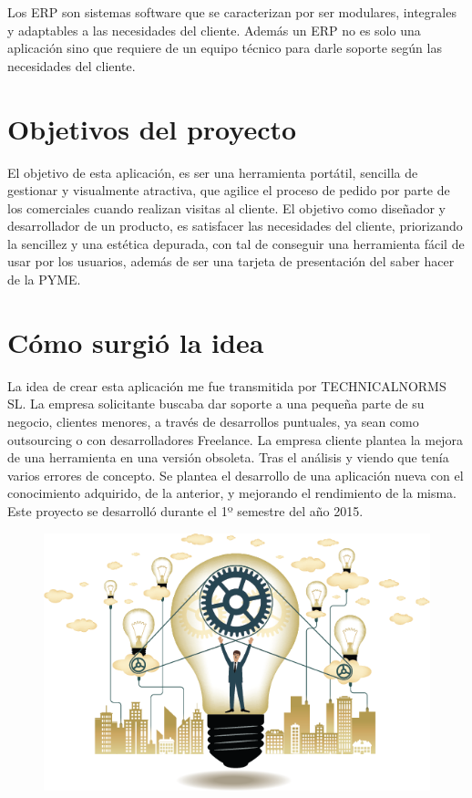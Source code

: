 Los ERP son sistemas software que se caracterizan por ser modulares, integrales y adaptables a las necesidades del cliente. Además un ERP no es solo una aplicación sino que requiere de un equipo técnico para darle soporte según las necesidades del cliente.

\section{Objetivos del proyecto}

El objetivo de esta aplicación, es ser una herramienta portátil, sencilla de gestionar y visualmente atractiva, que agilice el proceso de pedido por parte de los comerciales cuando realizan visitas al cliente.
El objetivo como diseñador y desarrollador de un producto, es satisfacer las necesidades del cliente, priorizando la sencillez y una estética depurada, con tal de conseguir una herramienta fácil de usar por los usuarios, además de ser una tarjeta de presentación del saber hacer de la PYME.

\section{Cómo surgió la idea}

La idea de crear esta aplicación me fue transmitida por TECHNICALNORMS SL. La empresa solicitante buscaba dar soporte a una pequeña parte de su negocio, clientes menores, a través de desarrollos puntuales, ya sean como outsourcing o con desarrolladores Freelance. 
La empresa cliente plantea la mejora de una herramienta en una versión obsoleta. Tras el análisis y viendo que tenía varios errores de concepto. Se plantea el desarrollo de una aplicación nueva con el conocimiento adquirido, de la anterior, y mejorando el rendimiento de la misma. Este proyecto se desarrolló durante el 1º semestre del año 2015.

\begin{figure}[H]
	\centering
	\includegraphics[width=0.8\linewidth]{figuras/idea}
	\label{fig:idea}
\end{figure}
